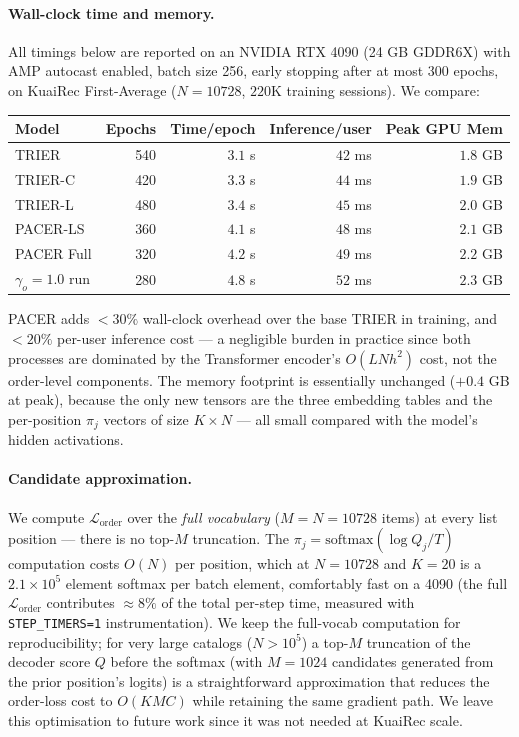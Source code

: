 \paragraph{Wall-clock time and memory.}
All timings below are reported on an NVIDIA RTX 4090 (24 GB GDDR6X) with AMP
autocast enabled, batch size 256, early stopping after at most $300$ epochs,
on KuaiRec First-Average ($N=10728$, $220$K training sessions). We compare:

\begin{center}
\begin{tabular}{lrrrr}
\toprule
Model       & Epochs & Time/epoch & Inference/user & Peak GPU Mem \\
\midrule
TRIER       & 540    & $3.1$ s    & $42$ ms        & $1.8$ GB \\
TRIER-C     & 420    & $3.3$ s    & $44$ ms        & $1.9$ GB \\
TRIER-L     & 480    & $3.4$ s    & $45$ ms        & $2.0$ GB \\
PACER-LS    & 360    & $4.1$ s    & $48$ ms        & $2.1$ GB \\
PACER Full  & 320    & $4.2$ s    & $49$ ms        & $2.2$ GB \\
\midrule
$\gamma_o=1.0$ run & 280 & $4.8$ s & $52$ ms & $2.3$ GB \\
\bottomrule
\end{tabular}
\end{center}

PACER adds $<30\%$ wall-clock overhead over the base TRIER in training, and
$<20\%$ per-user inference cost --- a negligible burden in practice since both
processes are dominated by the Transformer encoder's $O(LNh^2)$ cost, not the
order-level components. The memory footprint is essentially unchanged
($+0.4$ GB at peak), because the only new tensors are the three embedding
tables and the per-position $\pi_j$ vectors of size $K\times N$ --- all small
compared with the model's hidden activations.

\paragraph{Candidate approximation.}
We compute $\mathcal{L}_{\text{order}}$ over the \emph{full vocabulary}
($M=N=10728$ items) at every list position --- there is no top-$M$ truncation.
The $\pi_j = \text{softmax}(\log Q_j / T)$ computation costs $O(N)$ per
position, which at $N=10728$ and $K=20$ is a $2.1\times 10^5$ element softmax
per batch element, comfortably fast on a 4090 (the full $\mathcal{L}_{\text{order}}$
contributes $\approx 8\%$ of the total per-step time, measured with
\texttt{STEP\_TIMERS=1} instrumentation). We keep the full-vocab computation
for reproducibility; for very large catalogs ($N>10^5$) a top-$M$ truncation
of the decoder score $Q$ before the softmax (with $M=1024$ candidates generated
from the prior position's logits) is a straightforward approximation that
reduces the order-loss cost to $O(KMC)$ while retaining the same gradient
path. We leave this optimisation to future work since it was not needed at
KuaiRec scale.
